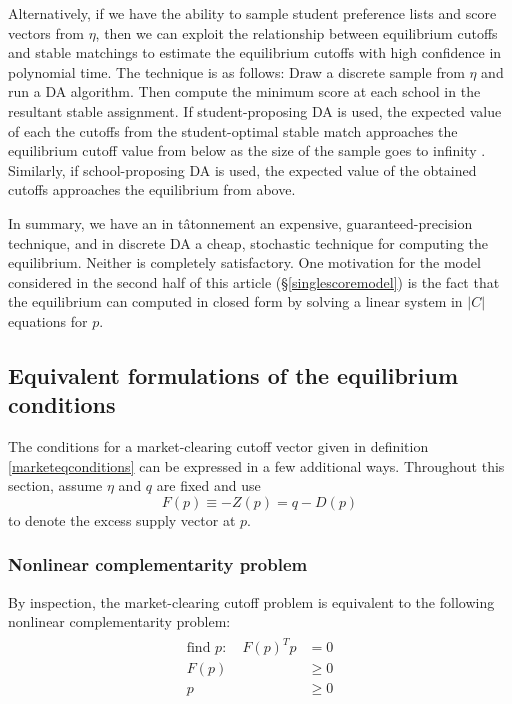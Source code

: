\documentclass[12pt]{article}
\numberwithin{equation}{subsection}
\theoremstyle{definition}
\begin{document}
Alternatively, if we have the ability to sample student preference lists and score vectors from $\eta$, then we can exploit the relationship between equilibrium cutoffs and stable matchings to estimate the equilibrium cutoffs with high confidence in polynomial time. The technique is as follows: Draw a discrete sample from $\eta$ and run a DA algorithm. Then compute the minimum score at each school in the resultant stable assignment. If student-proposing DA is used, the expected value of each the cutoffs from the student-optimal stable match approaches the equilibrium cutoff value from below as the size of the sample goes to infinity \parencite[][]{supplydemandfw}. Similarly, if school-proposing DA is used, the expected value of the obtained cutoffs approaches the equilibrium from above. 

In summary, we have an in t\^{a}tonnement an expensive, guaranteed-precision technique, and in discrete DA a cheap, stochastic technique for computing the equilibrium. Neither is completely satisfactory. One motivation for the model considered in the second half of this article (\S\ref{singlescoremodel}) is the fact that the equilibrium can computed in closed form by solving a linear system in $|C|$ equations for $p$.

\subsection{Equivalent formulations of the equilibrium conditions}
The conditions for a market-clearing cutoff vector given in definition \ref{marketeqconditions} can be expressed in a few additional ways. Throughout this section, assume $\eta$ and $q$ are fixed and use \[F(p) \equiv -Z(p) = q - D(p)\]
to denote the excess supply vector at $p$. 

\subsubsection{Nonlinear complementarity problem}
By inspection, the market-clearing cutoff problem is equivalent to the following nonlinear complementarity problem:
\begin{gather} \label{nonlinearcompprob}
\begin{aligned}
\text{find } p:\quad F(p)^T p & = 0 \\ F(p) &\geq 0 \\ p & \geq 0
\end{aligned}
\end{gather}
\end{document}
